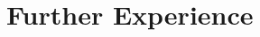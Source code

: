 \documentclass{article}
\renewenvironment{itemize}[1]{\begin{compactitem}#1}{\end{compactitem}}
\newcommand{\ExternalLink}{%
    \tikz[x=1.2ex, y=1.2ex, baseline=-0.05ex]{%
        \begin{scope}[x=1ex, y=1ex]
            \clip (-0.1,-0.1) 
                --++ (-0, 1.2) 
                --++ (0.6, 0) 
                --++ (0, -0.6) 
                --++ (0.6, 0) 
                --++ (0, -1);
            \path[draw, 
                line width = 0.5, 
                rounded corners=0.5] 
                (0,0) rectangle (1,1);
        \end{scope}
        \path[draw, line width = 0.5] (0.5, 0.5) 
            -- (1, 1);
        \path[draw, line width = 0.5] (0.6, 1) 
            -- (1, 1) -- (1, 0.6);
        }
    }
\let\orighref\href
\renewcommand{\href}[2]{\orighref{#1}{#2\,\ExternalLink}}
\begin{document}








\section{Further Experience}
\vspace{.5em}
\end{document}
